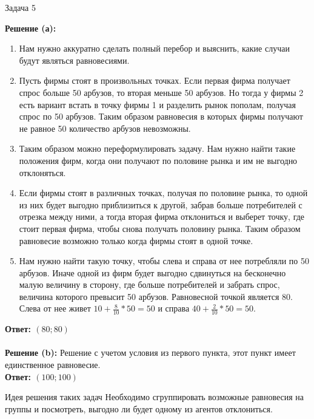 \begin{mybox}{Задача 5}
\begin{center}
    \end{center}
    \tcblower
    \indent\setlength{\parindent}{1em}\textbf{Решение (а):}
    \begin{enumerate}
        \item Нам нужно аккуратно сделать полный перебор и выяснить, какие случаи будут являться равновесиями.
        \item Пусть фирмы стоят в произвольных точках. Если первая фирма получает спрос больше 50 арбузов, то
        вторая меньше 50 арбузов. Но тогда у фирмы 2 есть вариант встать в точку фирмы 1 и разделить рынок пополам,
        получая спрос по 50 арбузов. Таким образом равновесия в которых фирмы получают не равное 50 количество
        арбузов невозможны.
        \item Таким образом можно переформулировать задачу. Нам нужно найти такие положения фирм, когда они получают
        по половине рынка и им не выгодно отклоняться.
        \item Если фирмы стоят в различных точках, получая по половине рынка, то одной из них будет выгодно
        приблизиться к другой, забрав больше потребителей с отрезка между ними, а тогда вторая фирма отклониться и
        выберет точку, где стоит первая фирма, чтобы снова получать половину рынка. Таким образом равновесие возможно
        только когда фирмы стоят в одной точке.
        \item Нам нужно найти такую точку, чтобы слева и справа от нее потребляли по 50 арбузов. Иначе одной из фирм
        будет выгодно сдвинуться на бесконечно малую величину в сторону, где больше потребителей и забрать спрос,
        величина которого превысит 50 арбузов. Равновесной точкой
        является 80. Слева от нее живет $10+\frac{8}{10}*50=50$ и справа $40+\frac{2}{10}*50=50$.
    \end{enumerate}
    \textbf{Ответ: $(80;80)$}\\\\
    \indent\setlength{\parindent}{1em}\textbf{Решение (b):}
    Решение с учетом условия из первого пункта, этот пункт имеет единственное равновесие.\\
    \textbf{Ответ: $(100;100)$}
\end{mybox}
\begin{mybox}{Идея решения таких задач}
    Необходимо сгруппировать возможные равновесия на группы и посмотреть, выгодно ли будет одному из агентов
    отклониться.
\end{mybox}
